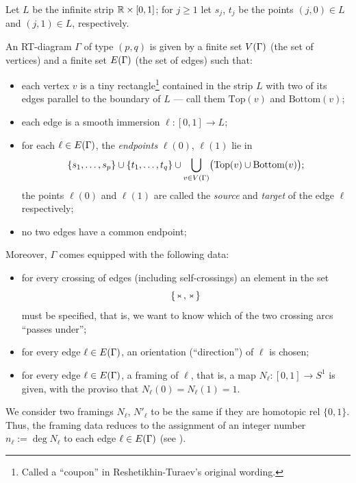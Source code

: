 Let $L$ be the infinite strip $\mathbb{R} \times [0,1]$; for $j \geq 1$ let
$s_j$, $t_j$ be the points $(j, 0) \in L$ and $(j,1) \in L$,
respectively.
\begin{definition}
  An RT-diagram $\Gamma$ of type $(p,q)$ is given by a finite set
  $V(\Gamma)$ (the set of vertices) and a finite set $E(\Gamma)$
  (the set of edges) such that:
  \begin{itemize}%
  \item  each vertex $v$ is a tiny
    rectangle\footnote{Called a ``coupon'' in Reshetikhin-Turaev's
      original wording.} contained in the strip $L$ with two of its
    edges parallel to the boundary of $L$ --- call them
    $\text{Top}(v)$ and $\text{Bottom}(v)$;\label{RT1}
  \item each edge is a smooth immersion $\ell\colon[0,1]\to L$;\label{RT2}
  \item  for each $\ell\in E(\Gamma)$, the \emph{endpoints}
    $\ell(0)$, $\ell(1)$ lie in \begin{equation*}\{s_1,\ldots, s_p\}\cup\{t_1,
      \ldots, t_q\}
      \cup\bigcup_{v\in V(\Gamma)}\bigl(\text{Top}(v)\cup\text{Bottom}(v)
      \bigr);\end{equation*} the points $\ell(0)$ and $\ell(1)$ are
    called the \emph{source} and \emph{target} of the edge $\ell$
    respectively;\label{RT3}
  \item  no two edges have a common endpoint;\label{RT4}
  \end{itemize}
  Moreover, $\Gamma$ comes equipped with the following data:
  \begin{itemize}
  \item for every crossing of edges (including self-crossings) an
    element in the set
    \begin{equation*}
      \left\{\, \xy*!LC\xybox{\vcross}\endxy \,,\, 
        \xy*!LC\xybox{\vcrossneg}\endxy \,\right\}
    \end{equation*}
    must be specified, that is, we want to know which of the two
    crossing arcs ``passes under'';\label{RT5}
  \item for every edge $\ell \in E(\Gamma)$, an orientation
    (``direction'') of $\ell$ is chosen;\label{RT6}
  \item for every edge $\ell \in E(\Gamma)$, a framing of $\ell$, that is,
    a map $N_\ell: [0,1] \to S^1$ is given, with the proviso that
    $N_\ell(0) = N_\ell(1) = 1$.\label{RT7}
  \end{itemize}
\end{definition}
We consider two framings $N_\ell$, $N'_\ell$ to be the same if they are
homotopic rel $\{0,1\}$. Thus, the framing data reduces to the
assignment of an integer number $n_\ell := \deg N_\ell$ to each edge $\ell
\in E(\Gamma)$ (see \cite{shum;tortile-categories}).

